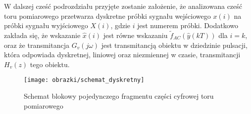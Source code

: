 W dalszej cześć podrozdziału przyjęte zostanie założenie, że analizowana cześć toru pomiarowego przetwarza dyskretne próbki sygnału wejściowego $x(i)$ na próbki sygnału wyjściowego $X(i)$, gdzie $i$ jest numerem próbki. Dodatkowo zakłada się, że wskazanie $\hat{x}(i)$ jest równe wskazaniu $\tilde{f}_{AC}(\hat{y}(kT))$ dla $i = k$, oraz że transmitancja $G_{v}(j\omega)$ jest transmitancją obiektu w dziedzinie pulsacji, która odpowiada dyskretnej, liniowej oraz niezmiennej w czasie, transmitancji $H_{v}(z)$ tego obiektu.

\begin{figure}[htb!]
\begin{center}
\texttt{[image: obrazki/schemat\_dyskretny]}
\caption{Schemat blokowy pojedynczego fragmentu części cyfrowej toru pomiarowego \label{fig_chain_disc}}
\end{center}
\end{figure}

